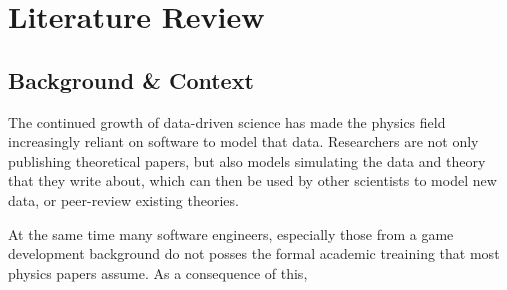 \chapter{Literature Review}


\section{Background \& Context}

The continued growth of data-driven science has made the physics field increasingly reliant on software to model that data. Researchers are not only publishing
theoretical papers, but also models simulating the data and theory that they write about, which can then be used by other scientists to model new data, or peer-review
existing theories.

At the same time many software engineers, especially those from a game development background do not posses the formal academic treaining that most physics papers
assume. As a consequence of this, 